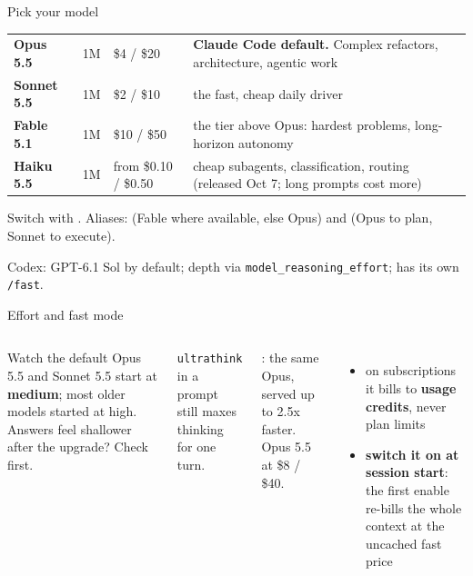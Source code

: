 \documentclass[aspectratio=169,11pt,t]{beamer}
\begin{document}
\begin{frame}{Pick your model}
  \small
  \begin{tabularx}{\textwidth}{@{}L{2.2cm}L{1.3cm}L{1.9cm}Y@{}}
    \toprule
     &  &  & \\
    \midrule
    \textbf{Opus 5.5} & 1M & \$4 / \$20 & \textbf{Claude Code default.} Complex refactors, architecture, agentic work\\
    \textbf{Sonnet 5.5} & 1M & \$2 / \$10 & the fast, cheap daily driver\\
    \textbf{Fable 5.1} & 1M & \$10 / \$50 & the tier above Opus: hardest problems, long-horizon autonomy\\
    \textbf{Haiku 5.5} & 1M & from \$0.10 / \$0.50 & cheap subagents, classification, routing (released Oct 7; long prompts cost more)\\
    \bottomrule
  \end{tabularx}\par\vspace{0.5em}
  Switch with . Aliases:  (Fable where available, else Opus) and  (Opus to plan, Sonnet to execute).\par\vspace{0.4em}
  {\footnotesize\color{muted}Codex: GPT-6.1 Sol by default; depth via \texttt{model\_reasoning\_effort}; has its own \texttt{/fast}.}
\end{frame}

\begin{frame}{Effort and fast mode}
  \begin{columns}[T,onlytextwidth]
      \par\vspace{0.35em}
          \par\vspace{0.5em}
      \begin{callout}[warn]{Watch the default}
        Opus 5.5 and Sonnet 5.5 start at \textbf{medium}; most older models started at high. Answers feel shallower after the upgrade? Check  first.
      \end{callout}
      {\footnotesize \texttt{ultrathink} in a prompt still maxes thinking for one turn.}
      \par\vspace{0.35em}
      \small {}: the same Opus, served up to 2.5x faster. Opus 5.5 at \$8 / \$40.
      \begin{itemize}\setlength\itemsep{0.3em}
        \item on subscriptions it bills to \textbf{usage credits}, never plan limits
        \item \textbf{switch it on at session start}: the first enable re-bills the whole context at the uncached fast price
      \end{itemize}
  \end{columns}
\end{frame}
\end{document}

